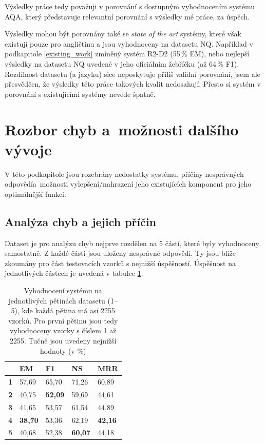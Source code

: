 Výsledky práce tedy považuji v porovnání s dostupným vyhodnocením systému AQA, který představuje relevantní porovnání s výsledky mé práce, za úspěch.\par
Výsledky mohou být porovnány také se \textit{state of the art} systémy, které však existují pouze pro angličtinu a jsou vyhodnoceny na datasetu NQ. Například v podkapitole \ref{existing_work} zmíněný systém R2-D2 (55\,\% EM), nebo nejlepší výsledky na datasetu NQ uvedené v jeho oficiálním žebříčku (až 64\,\% F1). Rozdílnost datasetu (a jazyku) sice neposkytuje příliš validní porovnání, jsem ale přesvědčen, že výsledky této práce takových kvalit nedosahují. Přesto si systém v porovnání s existujícími systémy nevede špatně.


\section{Rozbor chyb a~možnosti dalšího vývoje}
V této podkapitole jsou rozebrány nedostatky systému, příčiny nesprávných odpově\-dí\linebreak a~mož\-nosti vylepšení/nahrazení jeho existujících komponent pro jeho optimálnější funkci.\par
\subsection{Analýza chyb a jejich příčin}
Dataset je pro analýzu chyb nejprve rozdělen na 5 částí, které byly vyhodnoceny samostatně. Z každé části jsou uloženy nesprávné odpovědi. Ty jsou blíže zkoumány pro část testovacích vzorků s nejnižší úspěšností. Úspěšnost na jednotlivých částech je uvedená v tabulce \ref{tab:partial_eval}.

\begin{table}[H]
\centering
\begin{tabular}{|l|l|l|l|l|}
\hline
           & \textbf{EM} & \textbf{F1} & \textbf{NS} & \textbf{MRR} \\ \hline
\textbf{1} & 57,69       & 65,70       & 71,26       & 60,89        \\ \hline
\textbf{2} & 40,75       & \textbf{52,09}       & 59,69       & 44,61        \\ \hline
\textbf{3} & 41,65       & 53,57       & 61,54       & 44,89        \\ \hline
\textbf{4} & \textbf{38,70}       & 53,36       & 62,19       & \textbf{42,16}        \\ \hline
\textbf{5} & 40,68       & 52,38       & \textbf{60,07}       & 44,18        \\ \hline
\end{tabular}
\caption{Vyhodnocení systému na jednotlivých pětinách datasetu (1--5), kde každá pětina má asi 2255 vzorků. Pro první pětinu jsou tedy vyhodnoceny vzorky s číslem 1 až 2255. Tučně jsou uvedeny nejnižší hodnoty (v \%)}
\label{tab:partial_eval}
\end{table}

